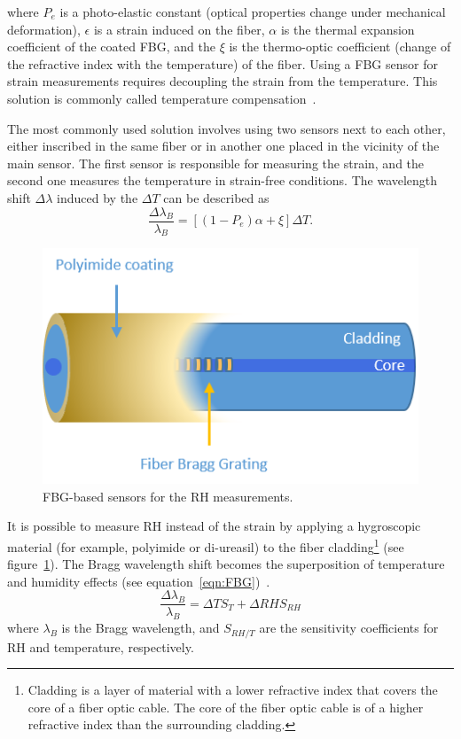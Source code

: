where $P_{e}$ is a photo-elastic constant (optical properties change under mechanical deformation), $\epsilon$ is a strain induced on the fiber, $\alpha$ is the thermal expansion coefficient of the coated \gls{FBG}, and the $\xi$ is the thermo-optic coefficient (change of the refractive index with the temperature) of the fiber. Using a \gls{FBG} sensor for strain measurements requires decoupling the strain from the temperature. This solution is commonly called temperature compensation~\cite{Yun-Jiang_Rao_1997}. 

The most commonly used solution involves using two sensors next to each other, either inscribed in the same fiber or in another one placed in the vicinity of the main sensor. The first sensor is responsible for measuring the strain, and the second one measures the temperature in strain-free conditions. The wavelength shift $\Delta \lambda$ induced by the $\Delta T$ can be described as
\begin{equation}
    \frac{\Delta\lambda_{B}}{\lambda_{B}}=\left [(1-P_{e}) \alpha + \xi  \right ] \Delta T.
\end{equation}


\begin{figure}[!h]
\centering
\includegraphics[width=0.45\columnwidth]{Chapter5/images/Picture1.png}
\caption{FBG-based sensors for the RH measurements.}
\label{fig:fbg_scheme}
\end{figure}


It is possible to measure RH instead of the strain by applying a hygroscopic material (for example, polyimide or di-ureasil) to the fiber cladding\footnote{Cladding is a layer of material with a lower refractive index that covers the core of a fiber optic cable. The core of the fiber optic cable is of a higher refractive index than the surrounding cladding.} (see figure~\ref{fig:fbg_scheme}). The Bragg wavelength shift becomes the superposition of temperature and humidity effects (see equation~\ref{eqn:FBG})~\cite{Kronenberg:02, YEO_PI}. 
                             \begin{equation}\label{eqn:FBG}
                                    \frac{\Delta\lambda_{B}}{\lambda_{B}}=\Delta TS_{T}+\Delta RHS_{RH}
                            \end{equation}
                            where $\lambda_{B}$ is the Bragg wavelength, and $S_{RH/T}$ are the sensitivity coefficients for RH and temperature, respectively. 

